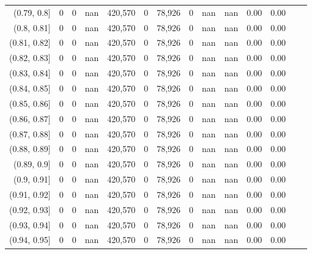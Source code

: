 \begin{tabular}{rrrrrrrrrrrrrr}
(0.79, 0.8]    &       0 &       0 &    nan &  420,570 &        0 &  78,926 &       0 &   nan &   nan &  0.00 &      0.00 \\
(0.8, 0.81]    &       0 &       0 &    nan &  420,570 &        0 &  78,926 &       0 &   nan &   nan &  0.00 &      0.00 \\
(0.81, 0.82]   &       0 &       0 &    nan &  420,570 &        0 &  78,926 &       0 &   nan &   nan &  0.00 &      0.00 \\
(0.82, 0.83]   &       0 &       0 &    nan &  420,570 &        0 &  78,926 &       0 &   nan &   nan &  0.00 &      0.00 \\
(0.83, 0.84]   &       0 &       0 &    nan &  420,570 &        0 &  78,926 &       0 &   nan &   nan &  0.00 &      0.00 \\
(0.84, 0.85]   &       0 &       0 &    nan &  420,570 &        0 &  78,926 &       0 &   nan &   nan &  0.00 &      0.00 \\
(0.85, 0.86]   &       0 &       0 &    nan &  420,570 &        0 &  78,926 &       0 &   nan &   nan &  0.00 &      0.00 \\
(0.86, 0.87]   &       0 &       0 &    nan &  420,570 &        0 &  78,926 &       0 &   nan &   nan &  0.00 &      0.00 \\
(0.87, 0.88]   &       0 &       0 &    nan &  420,570 &        0 &  78,926 &       0 &   nan &   nan &  0.00 &      0.00 \\
(0.88, 0.89]   &       0 &       0 &    nan &  420,570 &        0 &  78,926 &       0 &   nan &   nan &  0.00 &      0.00 \\
(0.89, 0.9]    &       0 &       0 &    nan &  420,570 &        0 &  78,926 &       0 &   nan &   nan &  0.00 &      0.00 \\
(0.9, 0.91]    &       0 &       0 &    nan &  420,570 &        0 &  78,926 &       0 &   nan &   nan &  0.00 &      0.00 \\
(0.91, 0.92]   &       0 &       0 &    nan &  420,570 &        0 &  78,926 &       0 &   nan &   nan &  0.00 &      0.00 \\
(0.92, 0.93]   &       0 &       0 &    nan &  420,570 &        0 &  78,926 &       0 &   nan &   nan &  0.00 &      0.00 \\
(0.93, 0.94]   &       0 &       0 &    nan &  420,570 &        0 &  78,926 &       0 &   nan &   nan &  0.00 &      0.00 \\
(0.94, 0.95]   &       0 &       0 &    nan &  420,570 &        0 &  78,926 &       0 &   nan &   nan &  0.00 &      0.00 \\

\end{tabular}
